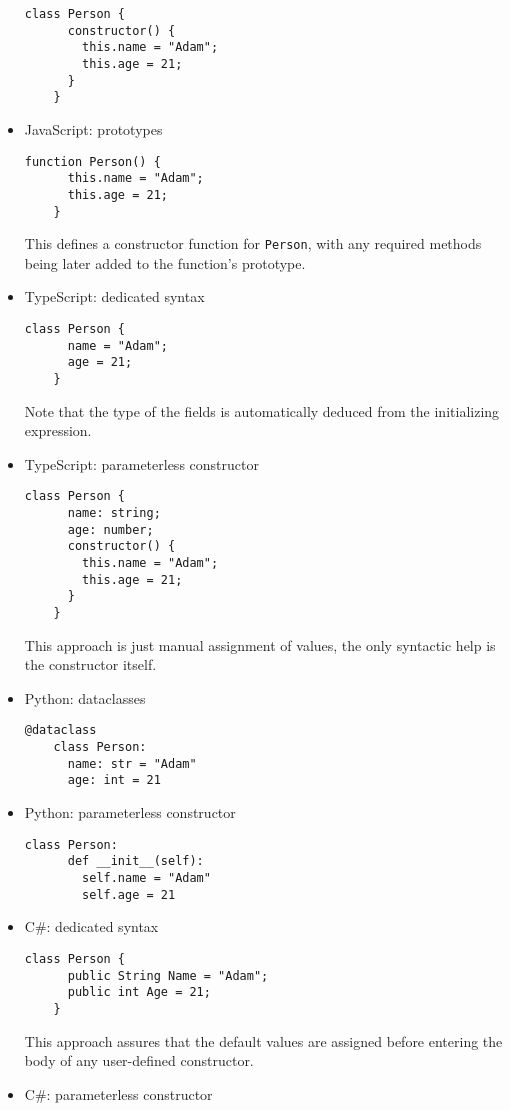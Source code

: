 \documentclass[en]{pracamgr}
\begin{document}
\begin{itemize}
  \begin{lstlisting}[style=JavaScript]
    class Person {
      constructor() {
        this.name = "Adam";
        this.age = 21;
      }
    }
  \end{lstlisting}
  \item JavaScript: prototypes
  \begin{lstlisting}[style=JavaScript]
    function Person() {
      this.name = "Adam";
      this.age = 21;
    }
  \end{lstlisting}
  This defines a constructor function for \texttt{Person}, with any required methods being later added to the function's prototype.
  \item TypeScript: dedicated syntax
  \begin{lstlisting}[style=TypeScript]
    class Person {
      name = "Adam";
      age = 21;
    }
  \end{lstlisting}
  Note that the type of the fields is automatically deduced from the initializing expression.
  \item TypeScript: parameterless constructor
  \begin{lstlisting}[style=TypeScript]
    class Person {
      name: string;
      age: number;
      constructor() {
        this.name = "Adam";
        this.age = 21;
      }
    }
  \end{lstlisting}
  This approach is just manual assignment of values, the only syntactic help is the constructor itself.
  \item Python: dataclasses
  \begin{lstlisting}[style=Python]
    @dataclass
    class Person:
      name: str = "Adam"
      age: int = 21
  \end{lstlisting}
  \item Python: parameterless constructor
  \begin{lstlisting}[style=Python]
    class Person:
      def __init__(self):
        self.name = "Adam"
        self.age = 21
  \end{lstlisting}
  \item C\#: dedicated syntax
  \begin{lstlisting}[style=CSharp]
    class Person {
      public String Name = "Adam";
      public int Age = 21;
    }
  \end{lstlisting}
  This approach assures that the default values are assigned before entering the body of any user-defined constructor.
  \item C\#: parameterless constructor
  \begin{lstlisting}[style=CSharp]

\end{lstlisting}
\end{itemize}
\end{document}
